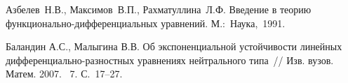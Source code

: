 
%

%

\begin{thebibliography}{9} %
 Азбелев~Н.В., Максимов~В.П., Рахматуллина~Л.Ф. Введение в теорию функ\-ци\-о\-наль\-но-дифференциальных уравнений. М.:~Наука,~1991.

 Баландин А.С., Малыгина В.В. Об экспоненциальной устойчивости линейных диф\-фе\-рен\-циально-разностных уравнениях нейтрального типа~// Изв. вузов. Матем. 2007. \textnumero~7. С.~17--27.




\end{thebibliography}





%